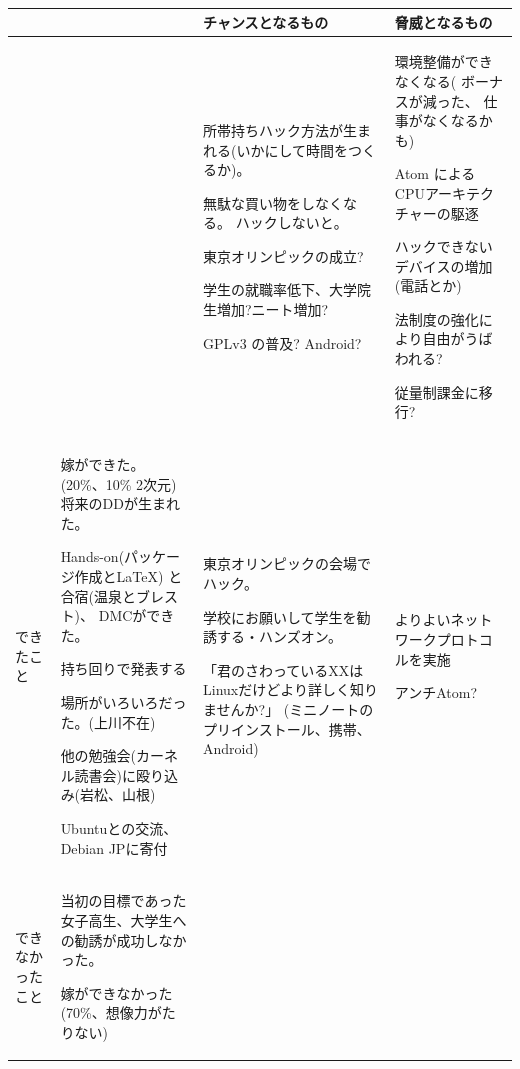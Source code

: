 \documentclass[mingoth,a4paper]{jsarticle}
\begin{document}
{\large
\begin{tabular}[t]{|p{4em}|p{11em}|p{11em}|p{11em}|}
\hline
 &  & チャンスとなるもの & 脅威となるもの  \\\hline
\vspace{0.2\vsize}~

 & & 
	 
所帯持ちハック方法が生まれる(いかにして時間をつくるか)。

無駄な買い物をしなくなる。
ハックしないと。

東京オリンピックの成立?

学生の就職率低下、大学院生増加?ニート増加?

GPLv3 の普及?
Android?

&

環境整備ができなくなる(
ボーナスが減った、
仕事がなくなるかも)

Atom によるCPUアーキテクチャーの駆逐

ハックできないデバイスの増加(電話とか)

法制度の強化により自由がうばわれる?

従量制課金に移行?

\\
\hline
できたこと & 

嫁ができた。(20\%、10\% 2次元)
将来のDDが生まれた。

Hands-on(パッケージ作成と\LaTeX{}) と合宿(温泉とブレスト)、
DMCができた。

持ち回りで発表する

場所がいろいろだった。(上川不在)

他の勉強会(カーネル読書会)に殴り込み(岩松、山根)

Ubuntuとの交流、Debian JPに寄付

&

東京オリンピックの会場でハック。

学校にお願いして学生を勧誘する・ハンズオン。

「君のさわっているXXはLinuxだけどより詳しく知りませんか?」
(ミニノートのプリインストール、携帯、Android)

& 

よりよいネットワークプロトコルを実施

アンチAtom?

\\
\hline

できなかったこと
&

当初の目標であった女子高生、大学生への勧誘が成功しなかった。

嫁ができなかった(70\%、想像力がたりない)


\end{tabular}}
\end{document}
